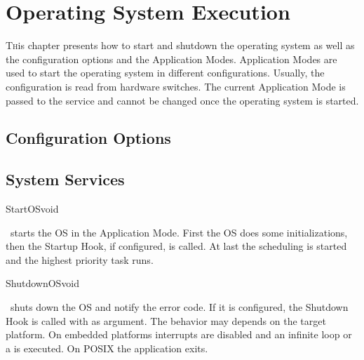 
\chapter{Operating System Execution}
\label{chap:appmodes}

\lettrine{T}his chapter presents how to start and shutdown the operating system as well as the configuration options and the Application Modes. Application Modes are used to start the operating system in different configurations. Usually, the configuration is read from hardware switches. The current Application Mode is passed to the  service and cannot be changed once the operating system is started. 

\section{Configuration Options}

\section{System Services}

\begin{service}{StartOS}{void}

\apiname\ starts the OS in the  Application Mode. First the OS does some initializations, then the Startup Hook, if configured, is called. At last the scheduling is started and the highest priority task runs.

\end{service}

\begin{service}{ShutdownOS}{void}

\apiname\ shuts down the OS and notify the  error code. If it is configured, the Shutdown Hook is called with  as argument. The behavior may depends on the target platform. On embedded platforms interrupts are disabled and an infinite loop or a  is executed. On POSIX the application exits.

\end{service}

